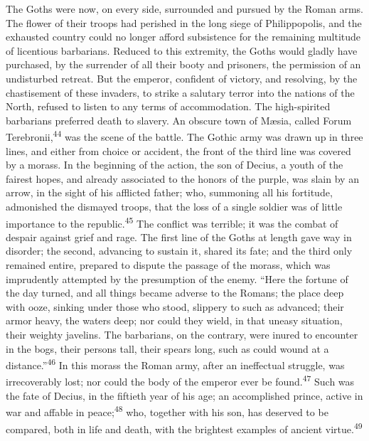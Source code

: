 The Goths were now, on every side, surrounded and pursued by the
Roman arms. The flower of their troops had perished in the long
siege of Philippopolis, and the exhausted country could no longer
afford subsistence for the remaining multitude of licentious
barbarians. Reduced to this extremity, the Goths would gladly
have purchased, by the surrender of all their booty and
prisoners, the permission of an undisturbed retreat. But the
emperor, confident of victory, and resolving, by the chastisement
of these invaders, to strike a salutary terror into the nations
of the North, refused to listen to any terms of accommodation.
The high-spirited barbarians preferred death to slavery. An
obscure town of Mæsia, called Forum Terebronii,\textsuperscript{44} was the scene
of the battle. The Gothic army was drawn up in three lines, and
either from choice or accident, the front of the third line was
covered by a morass. In the beginning of the action, the son of
Decius, a youth of the fairest hopes, and already associated to
the honors of the purple, was slain by an arrow, in the sight of
his afflicted father; who, summoning all his fortitude,
admonished the dismayed troops, that the loss of a single soldier
was of little importance to the republic.\textsuperscript{45} The conflict was
terrible; it was the combat of despair against grief and rage.
The first line of the Goths at length gave way in disorder; the
second, advancing to sustain it, shared its fate; and the third
only remained entire, prepared to dispute the passage of the
morass, which was imprudently attempted by the presumption of the
enemy. “Here the fortune of the day turned, and all things became
adverse to the Romans; the place deep with ooze, sinking under
those who stood, slippery to such as advanced; their armor heavy,
the waters deep; nor could they wield, in that uneasy situation,
their weighty javelins. The barbarians, on the contrary, were
inured to encounter in the bogs, their persons tall, their spears
long, such as could wound at a distance.”\textsuperscript{46} In this morass the
Roman army, after an ineffectual struggle, was irrecoverably
lost; nor could the body of the emperor ever be found.\textsuperscript{47} Such
was the fate of Decius, in the fiftieth year of his age; an
accomplished prince, active in war and affable in peace;\textsuperscript{48} who,
together with his son, has deserved to be compared, both in life
and death, with the brightest examples of ancient virtue.\textsuperscript{49}


